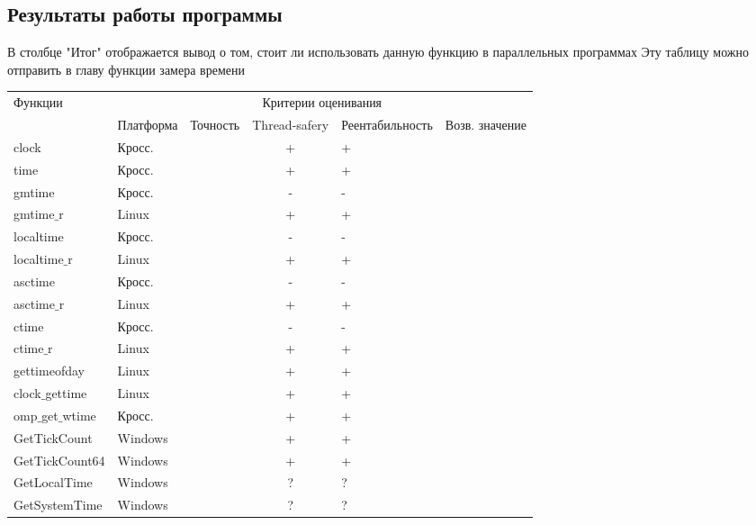 \documentclass{article}
\begin{document}
		\subsection{Результаты работы программы}
		В столбце "Итог" отображается вывод о том, стоит ли использовать данную функцию в параллельных программах
		Эту таблицу можно отправить в главу функции замера времени
		
		\newpage
		\begin{table}
			\begin{tabular}{|p{}|p{0.15\textwidth}|p{}| c | p{}|p{}|} 
			\hline
			\multirow{2}{*}{Функции} & \multicolumn{5}{|c|}{ Критерии оценивания	}\\
			\cline{2-6}
			\qquad & Платформа & Точность & Thread-safery & Реента\-бильность & Возв. значение \\
			\hline
			clock				& Кросс. 	& & + & + &						\\
			time				& Кросс. 	& & + & + &						\\
			gmtime				& Кросс. 	& & - & - &						\\
			gmtime$\_$r 		& Linux 	& & + & + &						\\
			localtime 			& Кросс. 	& & - & - &						\\
			localtime$\_$r		& Linux 	& & + & + &						\\
			asctime		 		& Кросс. 	& & - & - &						\\
			asctime$\_$r 		& Linux 	& & + & + &						\\
			ctime				& Кросс. 	& & - & - &						\\
			ctime$\_$r			& Linux 	& & + & + &						\\
			gettimeofday		& Linux 	& & + & + &						\\
			clock$\_$gettime	& Linux 	& & + & + &						\\
			omp$\_$get$\_$wtime	& Кросс. 	& & + & + &						\\
			GetTickCount		& Windows 	& & + & + & 						\\
			GetTickCount64		& Windows 	& & + & + &						\\
			GetLocalTime		& Windows 	& & ? & ? &						\\
			GetSystemTime		& Windows 	& & ? & ? &						\\
			\hline
			\end{tabular}		
		\end{table}
		
\end{document}
